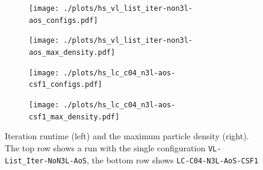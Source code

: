 
\begin{figure}[htpb]
	\centering
	\begin{subfigure}{0.5\textwidth}
		\texttt{[image: ./plots/hs\_vl\_list\_iter-non3l-aos\_configs.pdf]}
	\end{subfigure}%
	\begin{subfigure}{0.5\textwidth}
		\texttt{[image: ./plots/hs\_vl\_list\_iter-non3l-aos\_max\_density.pdf]}
	\end{subfigure}
	\begin{subfigure}{0.5\textwidth}
		\texttt{[image: ./plots/hs\_lc\_c04\_n3l-aos-csf1\_configs.pdf]}
	\end{subfigure}%
	\begin{subfigure}{0.5\textwidth}
		\texttt{[image: ./plots/hs\_lc\_c04\_n3l-aos-csf1\_max\_density.pdf]}
	\end{subfigure}
	\caption{Iteration runtime (left) and the maximum particle density (right). The top row shows a run with the single configuration \texttt{VL-List\_Iter-NoN3L-AoS}, the bottom row shows \texttt{LC-C04-N3L-AoS-CSF1}}
	\label{fig:liveinfo_heating_sphere}
\end{figure}





